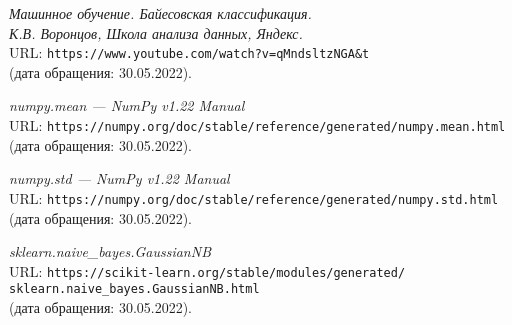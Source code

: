 \begin{thebibliography}{99}
{\itshape Машинное обучение. Байесовская классификация.\\К.В. Воронцов, Школа анализа данных, Яндекс.}\\
URL: \texttt{https://www.youtube.com/watch?v=qMndsltzNGA\&t}\\
(дата обращения: 30.05.2022).

{\itshape numpy.mean --- NumPy v1.22 Manual}\\
URL: \texttt{https://numpy.org/doc/stable/reference/generated/numpy.mean.html}\\
(дата обращения: 30.05.2022).

{\itshape numpy.std --- NumPy v1.22 Manual}\\
URL: \texttt{https://numpy.org/doc/stable/reference/generated/numpy.std.html}\\
(дата обращения: 30.05.2022).

{\itshape sklearn.naive\_bayes.GaussianNB}\\
URL: \texttt{https://scikit-learn.org/stable/modules/generated/\\sklearn.naive\_bayes.GaussianNB.html}\\
(дата обращения: 30.05.2022).

\end{thebibliography}
\pagebreak
